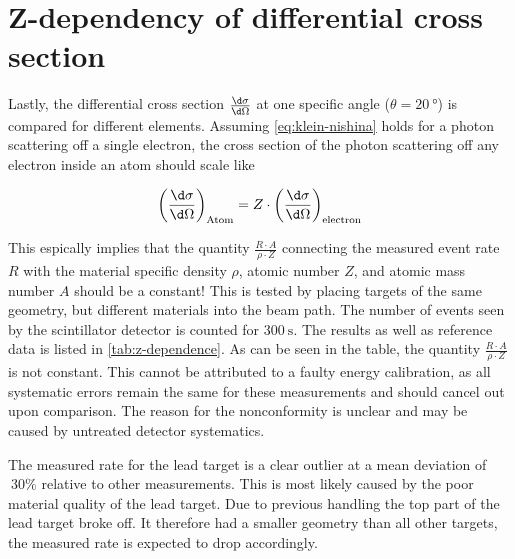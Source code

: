 
\section{Z-dependency of differential cross section}
\label{sec:z-dependence}

Lastly, the differential cross section $\frac{\d\sigma}{\d\Omega}$ at one specific
angle ($\theta = \SI{20}{\degree}$) is compared for different elements. Assuming
\autoref{eq:klein-nishina} holds for a photon scattering off a single electron, the
cross section of the photon scattering off any electron inside an atom should scale
like

\begin{equation}
\label{eq:z-dependence}
\left( \frac{\d\sigma}{\d\Omega} \right)_\text{Atom} = Z\cdot\left( \frac{\d\sigma}{\d\Omega} \right)_\text{electron}
\end{equation}

This espically implies that the quantity $\frac{R\cdot A}{\rho\cdot Z}$ connecting
the measured event rate $R$ with the material specific density $\rho$, atomic number
$Z$, and atomic mass number $A$ should be a constant! This is tested by placing
targets of the same geometry, but different materials into the beam path. The number
of events seen by the scintillator detector is counted for $\SI{300}{\second}$. The
results as well as reference data is listed in \autoref{tab:z-dependence}. As can be
seen in the table, the quantity $\frac{R\cdot A}{\rho\cdot Z}$ is not constant. This
cannot be attributed to a faulty energy calibration, as all systematic errors remain
the same for these measurements and should cancel out upon comparison. The reason for
the nonconformity is unclear and may be caused by untreated detector systematics.

The measured rate for the lead target is a clear outlier at a mean deviation of
$~30\%$ relative to other measurements. This is most likely caused by the poor
material quality of the lead target. Due to previous handling the top part of the
lead target broke off. It therefore had a smaller geometry than all other targets,
the measured rate is expected to drop accordingly.


